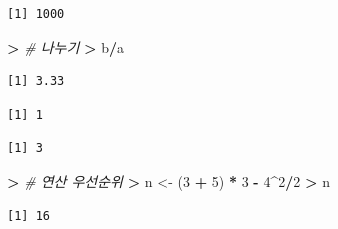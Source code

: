 \documentclass[11pt,a4paper]{book}
\newenvironment{Shaded}{\begin{snugshade}}{\end{snugshade}}
\newcommand{\DecValTok}[1]{\textcolor[rgb]{0.00,0.00,0.81}{#1}}
\newcommand{\StringTok}[1]{\textcolor[rgb]{0.31,0.60,0.02}{#1}}
\newcommand{\CommentTok}[1]{\textcolor[rgb]{0.56,0.35,0.01}{\textit{#1}}}
\newcommand{\OperatorTok}[1]{\textcolor[rgb]{0.81,0.36,0.00}{\textbf{#1}}}
\newcommand{\ErrorTok}[1]{\textcolor[rgb]{0.64,0.00,0.00}{\textbf{#1}}}
\newcommand{\NormalTok}[1]{#1}
\theoremstyle{definition}
\theoremstyle{definition}
\theoremstyle{definition}
\theoremstyle{remark}
\begin{document}
\begin{verbatim}
[1] 1000
\end{verbatim}

\begin{Shaded}
\begin{Highlighting}[]
\OperatorTok{>}\StringTok{ }\CommentTok{# 나누기}
\ErrorTok{>}\StringTok{ }\NormalTok{b}\OperatorTok{/}\NormalTok{a}
\end{Highlighting}
\end{Shaded}

\begin{verbatim}
[1] 3.33
\end{verbatim}

\begin{Shaded}
\end{Shaded}

\begin{verbatim}
[1] 1
\end{verbatim}

\begin{Shaded}
\end{Shaded}

\begin{verbatim}
[1] 3
\end{verbatim}

\begin{Shaded}
\begin{Highlighting}[]
\OperatorTok{>}\StringTok{ }\CommentTok{# 연산 우선순위}
\ErrorTok{>}\StringTok{ }\NormalTok{n <-}\StringTok{ }\NormalTok{(}\DecValTok{3} \OperatorTok{+}\StringTok{ }\DecValTok{5}\NormalTok{) }\OperatorTok{*}\StringTok{ }\DecValTok{3} \OperatorTok{-}\StringTok{ }\DecValTok{4}\OperatorTok{^}\DecValTok{2}\OperatorTok{/}\DecValTok{2}
\OperatorTok{>}\StringTok{ }\NormalTok{n}
\end{Highlighting}
\end{Shaded}

\begin{verbatim}
[1] 16
\end{verbatim}
\end{document}
